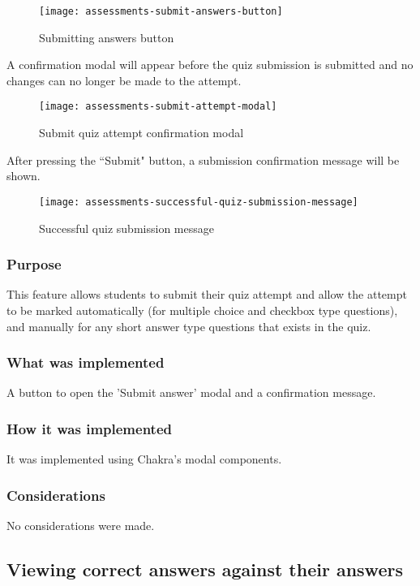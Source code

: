 \begin{figure}[h!]
	\centering
	\texttt{[image: assessments-submit-answers-button]}
	\caption{Submitting answers button}
\end{figure}

A confirmation modal will appear before the quiz submission is submitted and no changes can no longer be made to the attempt.

\begin{figure}[h!]
	\centering
	\texttt{[image: assessments-submit-attempt-modal]}
	\caption{Submit quiz attempt confirmation modal}
\end{figure}

After pressing the ``Submit" button, a submission confirmation message will be shown.

\begin{figure}[h!]
	\centering
	\texttt{[image: assessments-successful-quiz-submission-message]}
	\caption{Successful quiz submission message}
\end{figure}

\subsubsection{Purpose}
This feature allows students to submit their quiz attempt and allow the attempt to be marked automatically (for multiple choice and checkbox type questions), and manually for any short answer type questions that exists in the quiz.

\subsubsection{What was implemented}
A button to open the 'Submit answer' modal and a confirmation message.

\subsubsection{How it was implemented}
It was implemented using Chakra's modal components.

\subsubsection{Considerations}
No considerations were made.

\subsection{Viewing correct answers against their answers}

